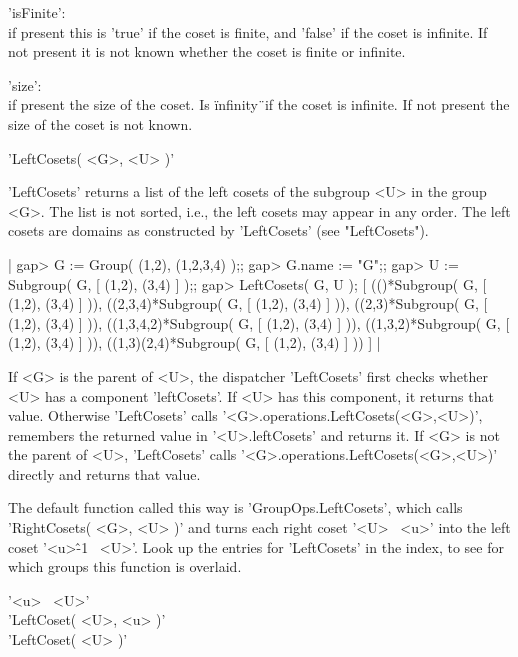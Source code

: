 'isFinite': \\
        if present this is 'true' if the coset  is  finite,  and  'false'
        if the coset is infinite.  If not present it is not known whether
        the coset is finite or infinite.

'size': \\
        if present the size of the coset.  Is \"infinity\"\ if the  coset
        is infinite.  If not present the size of the coset is not known.

%

'LeftCosets( <G>, <U> )'

'LeftCosets' returns a list of the left cosets of the subgroup <U> in the
group <G>.  The list is not  sorted, i.e., the left  cosets may appear in
any order.  The  left  cosets are domains as constructed  by 'LeftCosets'
(see "LeftCosets").

|    gap> G := Group( (1,2), (1,2,3,4) );;
    gap> G.name := "G";;
    gap> U := Subgroup( G, [ (1,2), (3,4) ] );;
    gap> LeftCosets( G, U );
    [ (()*Subgroup( G, [ (1,2), (3,4) ] )),
      ((2,3,4)*Subgroup( G, [ (1,2), (3,4) ] )),
      ((2,3)*Subgroup( G, [ (1,2), (3,4) ] )),
      ((1,3,4,2)*Subgroup( G, [ (1,2), (3,4) ] )),
      ((1,3,2)*Subgroup( G, [ (1,2), (3,4) ] )),
      ((1,3)(2,4)*Subgroup( G, [ (1,2), (3,4) ] )) ] |

If <G> is  the parent of  <U>,  the  dispatcher 'LeftCosets' first checks
whether  <U> has a component 'leftCosets'.  If <U> has this component, it
returns      that      value.       Otherwise      'LeftCosets'     calls
'<G>.operations.LeftCosets(<G>,<U>)',  remembers the  returned  value  in
'<U>.leftCosets' and  returns  it.   If  <G>  is not  the parent  of <U>,
'LeftCosets'   calls '<G>.operations.LeftCosets(<G>,<U>)'   directly  and
returns that value.

The default  function  called this  way is 'GroupOps.LeftCosets',   which
calls 'RightCosets( <G>, <U> )' and turns each right coset  '<U> \*\ <u>'
into  the  left  coset   '<u>\^-1 \*\  <U>'.    Look up   the entries for
'LeftCosets' in the  index,  to  see for  which  groups this function  is
overlaid.

%

'<u> \*\ <U>' \\
'LeftCoset( <U>, <u> )' \\
'LeftCoset( <U> )'

